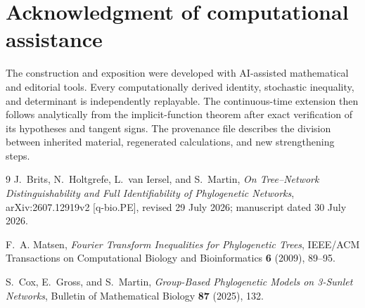 \documentclass[11pt]{article}
\theoremstyle{remark}
\begin{document}
\section*{Acknowledgment of computational assistance}
The construction and exposition were developed with AI-assisted mathematical and editorial tools.  Every computationally derived identity, stochastic inequality, and determinant is independently replayable.  The continuous-time extension then follows analytically from the implicit-function theorem after exact verification of its hypotheses and tangent signs.  The provenance file describes the division between inherited material, regenerated calculations, and new strengthening steps.

\enlargethispage{4\baselineskip}
\begingroup\small
\begin{thebibliography}{9}
J.~Brits, N.~Holtgrefe, L.~van Iersel, and S.~Martin,
\emph{On Tree--Network Distinguishability and Full Identifiability of
Phylogenetic Networks}, arXiv:2607.12919v2 [q-bio.PE], revised 29 July
2026; manuscript dated 30 July 2026.

F.~A. Matsen,
\emph{Fourier Transform Inequalities for Phylogenetic Trees},
IEEE/ACM Transactions on Computational Biology and Bioinformatics
\textbf{6} (2009), 89--95.

S.~Cox, E.~Gross, and S.~Martin,
\emph{Group-Based Phylogenetic Models on 3-Sunlet Networks},
Bulletin of Mathematical Biology \textbf{87} (2025), 132.
\end{thebibliography}
\endgroup
\end{document}
